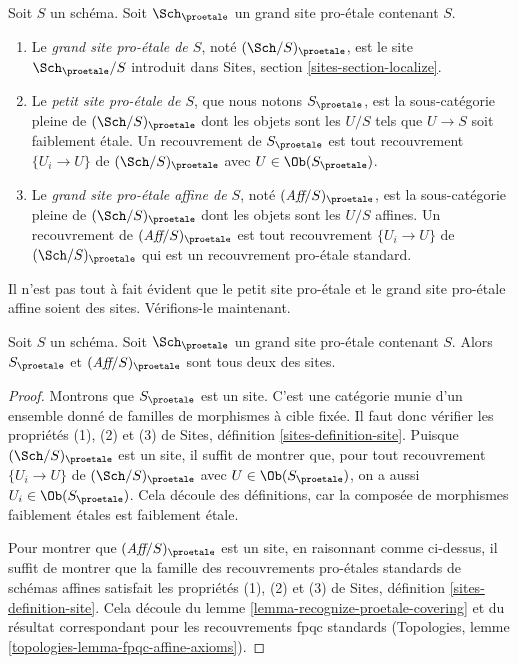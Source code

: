 \begin{definition}
\label{definition-big-small-proetale}
Soit $S$ un schéma. Soit $\Sch_\proetale$ un grand site pro-\'etale
contenant $S$.
\begin{enumerate}
\item Le {\it grand site pro-\'etale de $S$}, noté
$(\Sch/S)_\proetale$, est le site $\Sch_\proetale/S$
introduit dans Sites, section \ref{sites-section-localize}.
\item Le {\it petit site pro-\'etale de $S$}, que nous notons
$S_\proetale$, est la sous-catégorie pleine de $(\Sch/S)_\proetale$
dont les objets sont les $U/S$ tels que $U \to S$ soit faiblement \'etale.
Un recouvrement de $S_\proetale$ est tout recouvrement $\{U_i \to U\}$ de
$(\Sch/S)_\proetale$ avec $U \in \Ob(S_\proetale)$.
\item Le {\it grand site pro-\'etale affine de $S$}, noté
$(\textit{Aff}/S)_\proetale$, est la sous-catégorie pleine de
$(\Sch/S)_\proetale$ dont les objets sont les $U/S$ affines.
Un recouvrement de $(\textit{Aff}/S)_\proetale$ est tout recouvrement
$\{U_i \to U\}$ de $(\Sch/S)_\proetale$ qui est un
recouvrement pro-\'etale standard.
\end{enumerate}
\end{definition}

\noindent
Il n'est pas tout à fait évident que le petit site pro-\'etale et
le grand site pro-\'etale affine soient des sites. Vérifions-le maintenant.

\begin{lemma}
\label{lemma-verify-site-proetale}
Soit $S$ un schéma. Soit $\Sch_\proetale$ un grand site pro-\'etale
contenant $S$. Alors $S_\proetale$ et $(\textit{Aff}/S)_\proetale$ sont tous deux des sites.
\end{lemma}

\begin{proof}
Montrons que $S_\proetale$ est un site. C'est une catégorie munie d'un
ensemble donné de familles de morphismes à cible fixée. Il faut donc
vérifier les propriétés (1), (2) et (3) de
Sites, définition \ref{sites-definition-site}.
Puisque $(\Sch/S)_\proetale$ est un site, il suffit de montrer
que, pour tout recouvrement $\{U_i \to U\}$ de $(\Sch/S)_\proetale$
avec $U \in \Ob(S_\proetale)$, on a aussi $U_i \in \Ob(S_\proetale)$.
Cela découle des définitions,
car la composée de morphismes faiblement \'etales est faiblement \'etale.

\medskip\noindent
Pour montrer que $(\textit{Aff}/S)_\proetale$ est un site, en raisonnant comme ci-dessus,
il suffit de montrer que la famille des recouvrements pro-\'etales standards
de schémas affines satisfait les propriétés (1), (2) et (3) de
Sites, définition \ref{sites-definition-site}.
Cela découle du lemme \ref{lemma-recognize-proetale-covering}
et du résultat correspondant pour les recouvrements fpqc standards
(Topologies, lemme \ref{topologies-lemma-fpqc-affine-axioms}).
\end{proof}

